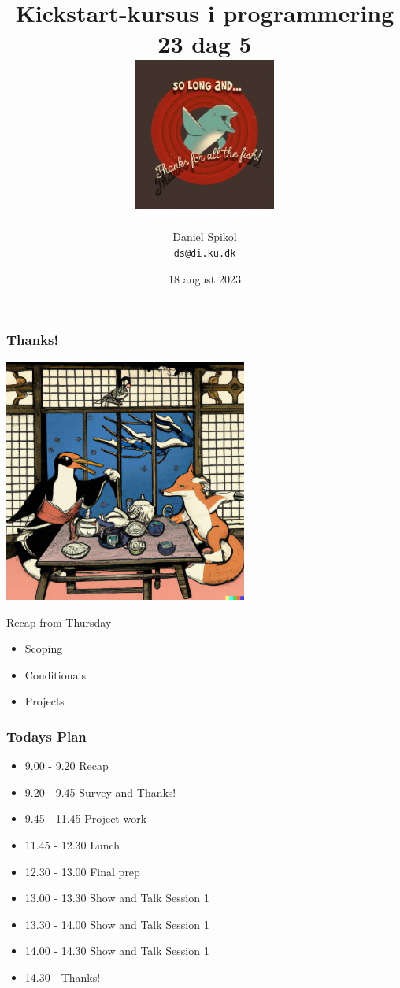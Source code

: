\documentclass[10pt]{beamer}
\title[Kickstart-kursus] %
  {Kickstart-kursus i programmering 23 dag 5\\ \includegraphics[height=5cm]{images/fish}} %
\author{\footnotesize{Daniel Spikol} \\
          \footnotesize{\texttt{ds@di.ku.dk}}}
\institute {DIKU \\ Københavns Universitet}
\date[18. august 2023]{18 august 2023}
\begin{document}
\begin{frame}[plain]
\titlepage
\end{frame}

\begin{frame}
   \frametitle{Thanks!}
   	 \includegraphics[height=8cm]{images/bye22}
\end{frame}
\begin{frame}{Recap from Thursday}
   	\begin{itemize}
	\item Scoping
	\item Conditionals
	\item Projects
	\end{itemize}
\end{frame}
\begin{frame}
\frametitle{Todays Plan}
\begin{itemize}
\item 9.00 - 9.20 Recap
\item 9.20 - 9.45 Survey and Thanks!
\item 9.45 - 11.45 Project work
\item 11.45 - 12.30 Lunch
\item 12.30 - 13.00 Final prep
\item 13.00 - 13.30 Show and Talk Session 1
\item 13.30 - 14.00 Show and Talk Session 1
\item 14.00 - 14.30 Show and Talk Session 1
\item 14.30 -  Thanks!
\end{itemize}
\end{frame}
\end{document}
